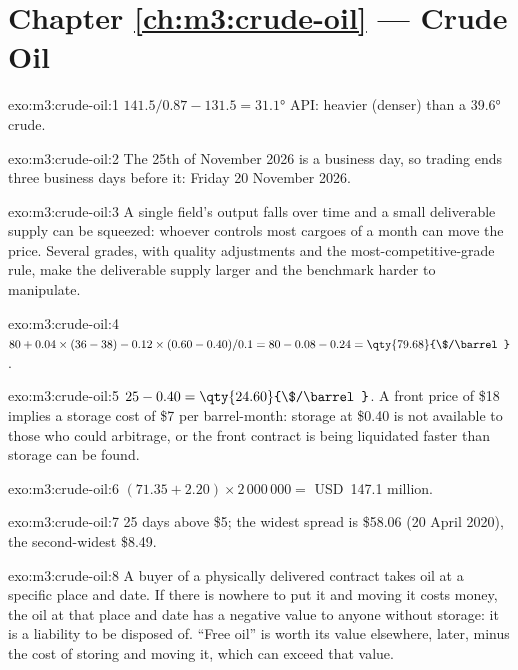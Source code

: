 \section*{Chapter \ref{ch:m3:crude-oil} --- Crude Oil}

\begin{solution}{exo:m3:crude-oil:1}
$141.5/0.87 - 131.5 = 31.1$° API: heavier (denser) than a 39.6° crude.
\end{solution}

\begin{solution}{exo:m3:crude-oil:2}
The 25th of November 2026 is a business day, so trading ends three business days
before it: Friday 20 November 2026.
\end{solution}

\begin{solution}{exo:m3:crude-oil:3}
A single field's output falls over time and a small deliverable supply can be
squeezed: whoever controls most cargoes of a month can move the price. Several grades,
with quality adjustments and the most-competitive-grade rule, make the deliverable
supply larger and the benchmark harder to manipulate.
\end{solution}

\begin{solution}{exo:m3:crude-oil:4}
$80 + 0.04 \times (36 - 38) - 0.12 \times (0.60 - 0.40)/0.1 = 80 - 0.08 - 0.24 =
\qty{79.68}{\$/\barrel}$.
\end{solution}

\begin{solution}{exo:m3:crude-oil:5}
$25 - 0.40 = \qty{24.60}{\$/\barrel}$. A front price of \$18 implies a storage cost of
\$7 per barrel-month: storage at \$0.40 is not available to those who could arbitrage,
or the front contract is being liquidated faster than storage can be found.
\end{solution}

\begin{solution}{exo:m3:crude-oil:6}
$(71.35 + 2.20) \times 2\,000\,000 = $ USD~147.1 million.
\end{solution}

\begin{solution}{exo:m3:crude-oil:7}
25 days above \$5; the widest spread is \$58.06 (20 April 2020), the second-widest
\$8.49.
\end{solution}

\begin{solution}{exo:m3:crude-oil:8}
A buyer of a physically delivered contract takes oil at a specific place and date.
If there is nowhere to put it and moving it costs money, the oil at that place and
date has a negative value to anyone without storage: it is a liability to be
disposed of. ``Free oil'' is worth its value elsewhere, later, minus the cost of
storing and moving it, which can exceed that value.
\end{solution}

